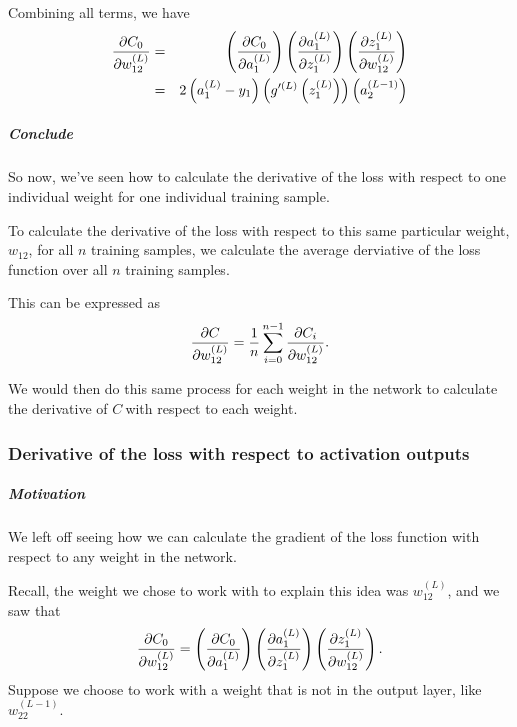 \documentclass{article}
\begin{document}
Combining all terms, we have%
\begin{eqnarray*}
\frac{\partial C_{0}}{\partial w_{12}^{(L)}} &=&\left( \frac{\partial C_{0}}{%
\partial a_{1}^{(L)}}\right) \left( \frac{\partial a_{1}^{(L)}}{\partial
z_{1}^{(L)}}\right) \left( \frac{\partial z_{1}^{(L)}}{\partial w_{12}^{(L)}}%
\right) \\
&=&2\left( a_{1}^{\left( L\right) }-y_{1}\right) \left( g^{\prime \left(
L\right) }\left( z_{1}^{\left( L\right) }\right) \right) \left(
a_{2}^{(L-1)}\right)
\end{eqnarray*}

\subparagraph{Conclude}

So now, we've seen how to calculate the derivative of the loss with respect
to one individual weight for one individual training sample.

To calculate the derivative of the loss with respect to this same particular
weight, $w_{12}$, for all $n$ training samples, we calculate the average
derviative of the loss function over all $n$ training samples.

This can be expressed as%
\[
\frac{\partial C}{\partial w_{12}^{(L)}}=\frac{1}{n}\sum_{i=0}^{n-1}\frac{%
\partial C_{i}}{\partial w_{12}^{(L)}}\text{.} 
\]

We would then do this same process for each weight in the network to
calculate the derivative of $C\ $with respect to each weight.

\subsubsection{\protect\vspace{1pt}Derivative of the loss with respect to
activation outputs}

\subparagraph{Motivation}

We left off seeing how we can calculate the gradient \newline
of the loss function with respect to any weight in the network.

Recall, the weight we chose to work with to explain this idea was $%
w_{12}^{\left( L\right) }$, and we saw that 
\[
\frac{\partial C_{0}}{\partial w_{12}^{(L)}}=\left( \frac{\partial C_{0}}{%
\partial a_{1}^{(L)}}\right) \left( \frac{\partial a_{1}^{(L)}}{\partial
z_{1}^{(L)}}\right) \left( \frac{\partial z_{1}^{(L)}}{\partial w_{12}^{(L)}}%
\right) \text{.} 
\]%
Suppose we choose to work with a weight that is not in the output layer,
like $w_{22}^{\left( L-1\right) }$.
\end{document}
